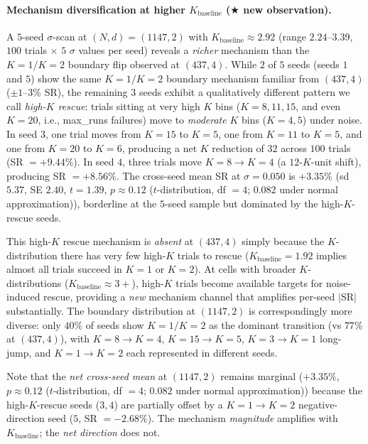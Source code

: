 \documentclass[11pt]{article}
\begin{document}
\paragraph{Mechanism diversification at higher $K_{\text{baseline}}$ ($\bigstar$ new observation).}
A $5$-seed $\sigma$-scan at $(N, d) = (1147, 2)$ with $K_{\text{baseline}} \approx 2.92$ (range $2.24$--$3.39$, $100$ trials $\times$ $5$ $\sigma$ values per seed) reveals a \emph{richer} mechanism than the $K = 1 / K = 2$ boundary flip observed at $(437, 4)$. While $2$ of $5$ seeds (seeds $1$ and $5$) show the same $K = 1 / K = 2$ boundary mechanism familiar from $(437, 4)$ ($\pm 1$--$3\%$ SR), the remaining $3$ seeds exhibit a qualitatively different pattern we call \emph{high-$K$ rescue}: trials sitting at very high $K$ bins ($K = 8, 11, 15$, and even $K = 20$, i.e., max\_runs failures) move to \emph{moderate} $K$ bins ($K = 4, 5$) under noise. In seed $3$, one trial moves from $K = 15$ to $K = 5$, one from $K = 11$ to $K = 5$, and one from $K = 20$ to $K = 6$, producing a net $K$ reduction of $32$ across $100$ trials (SR $= +9.44\%$). In seed $4$, three trials move $K = 8 \to K = 4$ (a $12$-$K$-unit shift), producing SR $= +8.56\%$. The cross-seed mean SR at $\sigma = 0.050$ is $+3.35\%$ (sd $5.37$, SE $2.40$, $t = 1.39$, $p \approx 0.12$ ($t$-distribution, df $= 4$; $0.082$ under normal approximation)), borderline at the $5$-seed sample but dominated by the high-$K$-rescue seeds.

This high-$K$ rescue mechanism is \emph{absent} at $(437, 4)$ simply because the $K$-distribution there has very few high-$K$ trials to rescue ($K_{\text{baseline}} = 1.92$ implies almost all trials succeed in $K = 1$ or $K = 2$). At cells with broader $K$-distributions ($K_{\text{baseline}} \approx 3+$), high-$K$ trials become available targets for noise-induced rescue, providing a \emph{new} mechanism channel that amplifies per-seed $|$SR$|$ substantially. The boundary distribution at $(1147, 2)$ is correspondingly more diverse: only $40\%$ of seeds show $K = 1 / K = 2$ as the dominant transition (vs $77\%$ at $(437, 4)$), with $K = 8 \to K = 4$, $K = 15 \to K = 5$, $K = 3 \to K = 1$ long-jump, and $K = 1 \to K = 2$ each represented in different seeds.

Note that the \emph{net cross-seed mean} at $(1147, 2)$ remains marginal ($+3.35\%$, $p \approx 0.12$ ($t$-distribution, df $= 4$; $0.082$ under normal approximation)) because the high-$K$-rescue seeds ($3, 4$) are partially offset by a $K = 1 \to K = 2$ negative-direction seed ($5$, SR $= -2.68\%$). The mechanism \emph{magnitude} amplifies with $K_{\text{baseline}}$; the \emph{net direction} does not.
\end{document}
